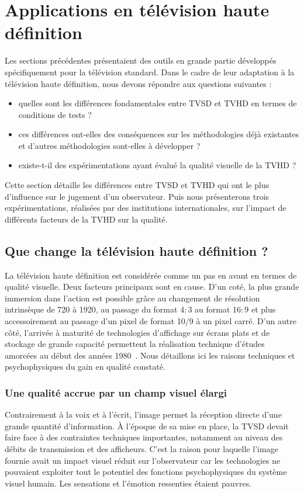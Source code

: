 \section{Applications en télévision haute définition} \label{tests:TVHD}
Les sections précédentes présentaient des outils en grande partie développés spécifiquement pour la télévision standard. Dans le cadre de leur adaptation à la télévision haute définition, nous devons répondre aux questions suivantes :
\begin{itemize}
\item quelles sont les différences fondamentales entre TVSD et TVHD en termes de conditions de tests ?
\item ces différences ont-elles des conséquences sur les méthodologies déjà existantes et d'autres méthodologies sont-elles à développer ?
\item existe-t-il des expérimentations ayant évalué la qualité visuelle de la TVHD ?
\end{itemize}

Cette section détaille les différences entre TVSD et TVHD qui ont le plus d'influence sur le jugement d'un observateur. Puis nous présenterons trois expérimentations, réalisées par des institutions internationales, sur l'impact de différents facteurs de la TVHD sur la qualité.


\subsection{Que change la télévision haute définition ?} \label{ssec:Que_change_la_télévision_haute_définition}
La télévision haute définition est considérée comme un pas en avant en termes de qualité visuelle. Deux facteurs principaux sont en cause. D'un coté, la plus grande immersion dans l'action est possible grâce au changement de résolution intrinsèque de 720 à 1920, au passage du format 4$:$3 au format 16$:$9 et plus accessoirement au passage d'un pixel de format 10/9 à un pixel carré. D'un autre côté, l'arrivée à maturité de technologies d'affichage sur écrans plats et de stockage de grande capacité permettent la réalisation technique d'études amorcées au début des années 1980~\cite{fujio-futureHDTV,mitsuhashi-scanning,yuyama-largescreeneffects}. Nous détaillons ici les raisons techniques et psychophysiques du gain en qualité constaté.

\subsubsection{Une qualité accrue par un champ visuel élargi}
Contrairement à la voix et à l'écrit, l'image permet la réception directe d'une grande quantité d'information. À l'époque de sa mise en place, la TVSD devait faire face à des contraintes techniques importantes, notamment au niveau des débits de transmission et des afficheurs. C'est la raison pour laquelle l'image fournie avait un impact visuel réduit sur l'observateur car les technologies ne pouvaient exploiter tout le potentiel des fonctions psychophysiques du système visuel humain. Les sensations et l'émotion ressenties étaient pauvres.


